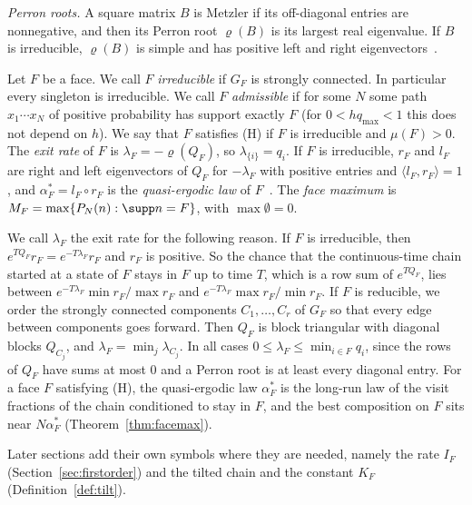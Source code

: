\emph{Perron roots.} A square matrix $B$ is Metzler if its off-diagonal entries
are nonnegative, and then its Perron root $\varrho(B)$ is its largest real
eigenvalue.
If $B$ is irreducible, $\varrho(B)$ is simple and has positive left and right
eigenvectors~\cite{bermanplemmons1994}.

\begin{definition}[faces]\label{def:faces}
Let $F$ be a face. We call $F$ \emph{irreducible} if $G_F$ is strongly connected.
In particular every singleton is irreducible. We call $F$ \emph{admissible} if for some
$N$ some path $x_1\cdots x_N$ of positive probability has support exactly $F$
(for $0<hq_{\max}<1$ this does not depend on $h$).
We say that $F$ satisfies \textup{(H)} if $F$ is irreducible and $\mu(F)>0$.
The \emph{exit rate} of $F$ is $\lambda_F=-\varrho(Q_F)$, so
$\lambda_{\{i\}}=q_i$. If $F$ is irreducible, $r_F$ and $l_F$ are right and left
eigenvectors of $Q_F$ for $-\lambda_F$ with positive entries and
$\langle l_F,r_F\rangle=1$, and $\alpha^*_F=l_F\circ r_F$ is the
\emph{quasi-ergodic law} of $F$~\cite{darrochseneta1965,darrochseneta1967}. The
\emph{face maximum} is $M_F=\max\{P_N(n):\supp n=F\}$, with $\max\emptyset=0$.
\end{definition}

We call $\lambda_F$ the exit rate for the following reason. If $F$ is
irreducible, then $e^{TQ_F}r_F=e^{-T\lambda_F}r_F$ and $r_F$ is positive. So
the chance that the continuous-time chain started at a state of $F$ stays in
$F$ up to time $T$, which is a row sum of $e^{TQ_F}$, lies between
$e^{-T\lambda_F}\min r_F/\max r_F$ and $e^{-T\lambda_F}\max r_F/\min r_F$. If
$F$ is reducible, we order the strongly connected components $C_1,\dots,C_r$ of
$G_F$ so that every edge between components goes forward. Then $Q_F$ is block
triangular with diagonal blocks $Q_{C_j}$, and
$\lambda_F=\min_j\lambda_{C_j}$. In all cases $0\le\lambda_F\le\min_{i\in
F}q_i$, since the rows of $Q_F$ have sums at most $0$ and a Perron root is at
least every diagonal entry. For a face $F$ satisfying (H), the quasi-ergodic law
$\alpha^*_F$ is the long-run law of the visit fractions of the chain conditioned
to stay in $F$, and the best composition on $F$ sits near $N\alpha^*_F$
(Theorem~\ref{thm:facemax}).

Later sections add their own symbols where they are needed, namely the rate
$I_F$ (Section~\ref{sec:firstorder}) and the tilted chain and the constant $K_F$
(Definition~\ref{def:tilt}).


